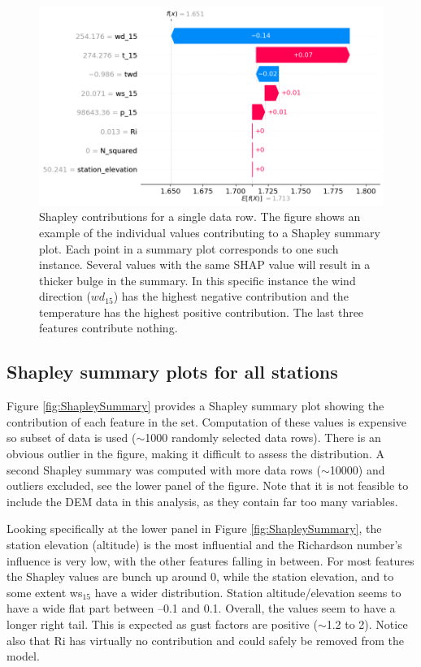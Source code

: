 \begin{figure}
  \centering
  \includegraphics[scale = 0.6]{Figures/shap_plots/waterfall_plot.png}
  \caption[Shapley contributions for a single observation]{Shapley contributions for a single data row. The figure shows an example of the individual values contributing to a Shapley summary plot. Each point in a summary plot corresponds to one such instance. Several values with the same SHAP value will result in a thicker bulge in the summary. In this specific instance the wind direction ($wd_{15}$) has the highest negative contribution and the temperature has the highest positive contribution. The last three features contribute nothing.}
  \label{fig:ShapleyWaterfall}
\end{figure}

\subsection{Shapley summary plots for all stations}
Figure \ref{fig:ShapleySummary} provides a Shapley summary plot showing the contribution of each feature in the set. Computation of these values is expensive so subset of data is used ($\sim$1000 randomly selected data rows). There is an obvious outlier in the figure, making it difficult to assess the distribution. A second Shapley summary was computed with more data rows ($\sim$10000) and outliers excluded, see the lower panel of the figure. Note that it is not feasible to include the DEM data in this analysis, as they contain far too many variables.

Looking specifically at the lower panel in Figure \ref{fig:ShapleySummary}, the station elevation (altitude) is the most influential and the Richardson number's influence is very low, with the other features falling in between. For most features the Shapley values are bunch up around 0, while the station elevation, and to some extent ws$_{15}$ have a wider distribution. Station altitude/elevation seems to have a wide flat part between –0.1 and 0.1. Overall, the values seem to have a longer right tail. This is expected as gust factors are positive ($\sim$1.2 to 2). Notice also that Ri has virtually no contribution and could safely be removed from the model.

